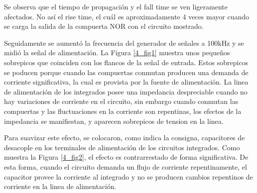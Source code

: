Se observa que el tiempo de propagación y el fall time se ven ligeramente afectados. No así el rise time, el cuál es aproximadamente 4 veces mayor cuando se carga la salida de la compuerta NOR con el circuito mostrado.

\bigskip
Seguidamente se aumentó la frecuencia del generador de señales a 100kHz y se midió la señal de alimentación. La Figura \ref{4_fig1} muestra unos pequeños sobrepicos que coinciden con los flancos de la señal de entrada. Estos sobrepicos se poducen porque cuando las compuertas conmutan producen una demanda de corriente significativa, la cual es provista por la fuente de alimentación. La linea de alimentación de los integrados posee una impedancia despreciable cuando no hay variaciones de corriente en el circuito, sin embargo cuando conmutan las compuertas y las fluctuaciones en la corriente son repentinas, los efectos de la impedancia se manifiestan, y aparecen sobrepicos de tension en la linea.

Para suavizar este efecto, se colocaron, como indica la consigna, capacitores de desacople en los terminales de alimentación de los circuitos integrados. Como muestra la Figura \ref{4_fig2}, el efecto es contrarrestado de forma significativa. De esta forma, cuando el circuito demanda un flujo de corriente repentinamente, el capacitor provee la corriente al integrado y no se producen cambios repentinos de corriente en la linea de alimentación.


